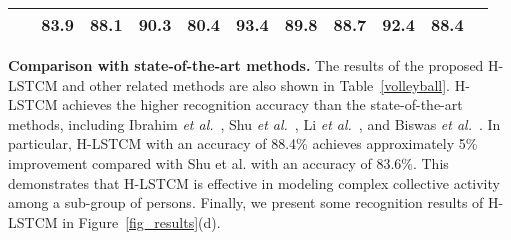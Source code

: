 \documentclass[9pt,journal,letterpaper,twocolumn]{IEEEtran}
\begin{document}
{\begin{table}[!t]
{\begin{tabular}{lcccccccccc}
			\hspace{-0.5em}{H-LSTCM} & \hspace{-0.5em}~83.9\hspace{-0.5em}&	\hspace{-0.5em}88.1\hspace{-0.5em}&	\hspace{-0.5em}90.3\hspace{-0.5em}&	\hspace{-0.5em}80.4\hspace{-0.5em}&	\hspace{-0.5em}93.4\hspace{-0.5em}&	\hspace{-0.5em}89.8\hspace{-0.5em}&	\hspace{-0.5em}88.7\hspace{-0.5em}&	\hspace{-0.5em}92.4\hspace{-0.5em}&	\hspace{-0.5em}88.4\hspace{-0.5em}
			\\
			\hline
		\end{tabular}
	}
\end{table}
		
		
		
		
		
		{\bf Comparison with state-of-the-art methods.}  The results  of the proposed H-LSTCM and other related methods are also shown in Table~\ref{volleyball}.  H-LSTCM achieves the higher recognition accuracy than the state-of-the-art methods, including Ibrahim {\em et al.}~\cite{ibrahim2015hierarchical}, Shu {\em et al.}~\cite{shu2016cern}, Li {\em et al.}~\cite{li2017sbgar}, and Biswas {\em et al.}~\cite{biswas2018structural}. In particular, H-LSTCM with an accuracy of 88.4\% achieves approximately 5\% improvement compared with Shu et al. with an accuracy of 83.6\%. This demonstrates that H-LSTCM is effective in modeling complex collective activity among a sub-group of persons. Finally, we present some recognition results of H-LSTCM in Figure~\ref{fig_results}(d).
	}
	
	
	
	
	
	


	
	
\end{document}
